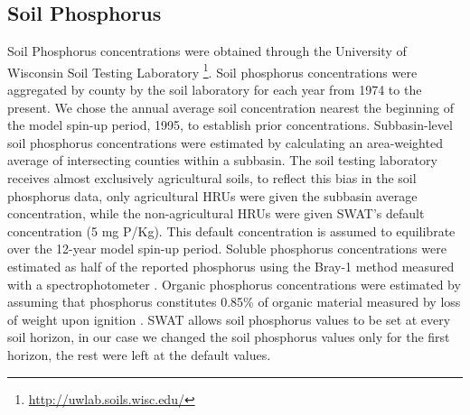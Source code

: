 \subsection{Soil Phosphorus}\label{sec:soil_phosphorus}
Soil Phosphorus concentrations were obtained through the University of Wisconsin
Soil Testing Laboratory \footnote{\url{http://uwlab.soils.wisc.edu/}}. Soil
phosphorus concentrations were aggregated by county by the soil laboratory for
each year from 1974 to the present. We chose the annual average soil
concentration nearest the beginning of the model spin-up period, 1995, to
establish prior concentrations. Subbasin-level soil phosphorus concentrations
were estimated by calculating an area-weighted average of intersecting counties
within a subbasin.
The soil testing laboratory receives almost exclusively agricultural soils, to reflect this bias in the soil phosphorus data, only agricultural HRUs were given the subbasin average concentration, while the non-agricultural HRUs were given SWAT's default concentration (5 mg P/Kg). This default concentration is assumed to equilibrate over the 12-year model spin-up period. 
Soluble phosphorus
concentrations were estimated as half of the reported phosphorus using the
Bray-1 method measured with a spectrophotometer \citep{vadas_validating_2010}.
Organic phosphorus concentrations were estimated by assuming that phosphorus
constitutes 0.85\% of organic material measured by loss of weight upon ignition
\citep{havlin_soilfertility_2005}. 
SWAT allows soil phosphorus values to be set at every soil horizon, in our case we changed the 
soil phosphorus values only for the first horizon, the rest were left at the default values.
